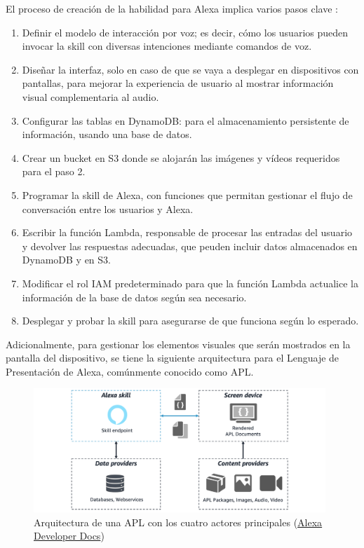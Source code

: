 \newpage

El proceso de creación de la habilidad para Alexa implica varios pasos clave \parencite{arquitecturaSkill}:
\begin{enumerate}
	\item Definir el modelo de interacción por voz; es decir, cómo los usuarios pueden invocar la skill con diversas intenciones mediante comandos de voz.
	\item Diseñar la interfaz, solo en caso de que se vaya a desplegar en dispositivos con pantallas, para mejorar la experiencia de usuario al mostrar información visual complementaria al audio.
	\item Configurar las tablas en DynamoDB: para el almacenamiento persistente de información, usando una base de datos.
	\item Crear un bucket en S3 donde se alojarán las imágenes y vídeos requeridos para el paso 2.
	\item Programar la skill de Alexa, con funciones que permitan gestionar el flujo de conversación entre los usuarios y Alexa.
	\item Escribir la función Lambda, responsable de procesar las entradas del usuario y devolver las respuestas adecuadas, que peuden incluir datos almacenados en DynamoDB y en S3.
	\item Modificar el rol IAM predeterminado para que la función Lambda actualice la información de la base de datos según sea necesario.
	\item Desplegar y probar la skill para asegurarse de que funciona según lo esperado.
\end{enumerate}

Adicionalmente, para gestionar los elementos visuales que serán mostrados en la pantalla del dispositivo, se tiene la siguiente arquitectura para el Lenguaje de Presentación de Alexa, comúnmente conocido como APL.

\begin{figure}[H]
	\centering
	\includegraphics[width=0.98\textwidth]{imgs/arquitectura-apl.png}
	\caption{Arquitectura de una APL con los cuatro actores principales (\href{https://developer.amazon.com/en-US/docs/alexa/alexa-presentation-language/apl-bp-understand-apl-architecture.html}{Alexa Developer Docs})}
\label{fig:arquitectura-apl}
\end{figure}

